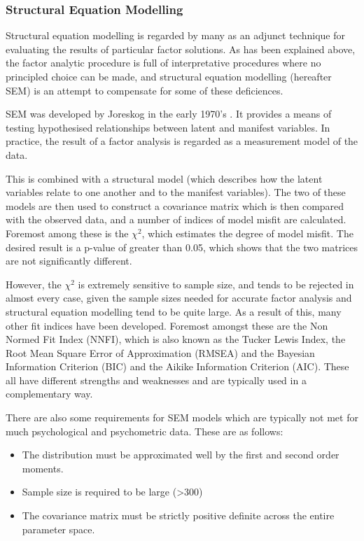 \subsubsection{Structural Equation Modelling}

Structural equation modelling is regarded by many as an adjunct technique for evaluating the results of particular factor solutions\cite{fabrigar1999evaluating}. As has been explained above, the factor analytic procedure is full of interpretative procedures where no principled choice can be made, and structural equation modelling (hereafter SEM) is an attempt to compensate for some of these deficiences.

SEM was developed by Joreskog in the early 1970's \cite{joreskog1978structural}. It provides a means of testing hypothesised relationships between latent and manifest variables. In practice, the result of a factor analysis is regarded as a measurement model of the data. 

This is combined with a structural model (which describes how the latent variables relate to one another and to the manifest variables). The two of these models are then used to construct a covariance matrix which is then compared with the observed data, and a number of indices of model misfit are calculated. Foremost among these is the $\chi^2$, which estimates the degree of model misfit. The desired result is a p-value of greater than 0.05, which shows that the two matrices are not significantly different. 

However, the $\chi^2$  is extremely sensitive to sample size, and tends to be rejected in almost every case\cite{henson2006use}, given the sample sizes needed for accurate factor analysis and structural equation modelling tend to be quite large. As a result of this, many other fit indices have been developed. Foremost amongst these are the Non Normed Fit Index (NNFI), which is also known as the Tucker Lewis Index, the Root Mean Square Error of Approximation (RMSEA) and the Bayesian Information Criterion (BIC) and the Aikike Information Criterion (AIC). These all have different strengths and weaknesses and are typically used in a complementary way. 

There are also some requirements for SEM models which are typically not met for much psychological and psychometric data. These are as follows:
\begin{itemize}
\item The distribution must be approximated well by the first and second order moments. 
\item Sample size is required to be large (>300)
\item The covariance matrix must be strictly positive definite across the entire parameter space.
\end{itemize}

